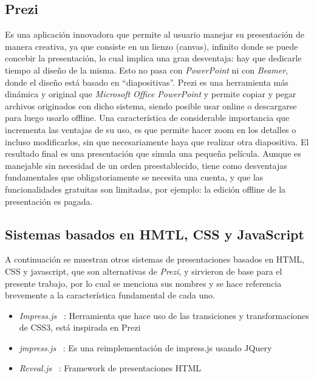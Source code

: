 
		\subsection{Prezi} %
		\label{sub:prezi}

			Es una aplicación innovadora que permite al usuario manejar su presentación de manera creativa, ya que consiste en un lienzo (canvas), infinito donde se puede concebir la presentación, lo cual implica una gran desventaja: hay que dedicarle tiempo al diseño de la misma. Esto no pasa con \textit{PowerPoint} ni con \textit{Beamer}, donde el diseño está basado en ``diapositivas''. Prezi es una herramienta más dinámica y original que \textit{Microsoft Office PowerPoint} y permite copiar y pegar archivos originados con dicho sistema, siendo posible usar online o descargarse para luego usarlo offline.  Una característica de considerable importancia que incrementa las ventajas de su uso, es que permite hacer zoom en los detalles o incluso modificarlos, sin que necesariamente haya que realizar otra diapositiva. El resultado final es una presentación que simula una pequeña película. Aunque es manejable sin necesidad de un orden preestablecido, tiene como desventajas fundamentales que obligatoriamente se necesita una cuenta, y que las funcionalidades gratuitas son limitadas, por ejemplo: la edición offline de la presentación es pagada.



		\subsection{Sistemas basados en HMTL, CSS y JavaScript} %
		\label{sub:otros_sistemas}
			A continuación se muestran otros sistemas de presentaciones basados en HTML, CSS y javascript, que son alternativas de \textit{Prezi}, y sirvieron de base para el presente trabajo, por lo cual se menciona sus nombres y se hace referencia brevemente a la característica fundamental de cada uno.
			\begin{itemize}
				\item \textit{Impress.js} ~\cite{impress}: Herramienta que hace uso de las transiciones y transformaciones de CSS3, está inspirada en Prezi
				\item \textit{jmpress.js} ~\cite{jmpress}: Es una reimplementación de impress.js usando JQuery
				\item \textit{Reveal.js} ~\cite{reveal}: Framework de presentaciones HTML
			\end{itemize}
	

